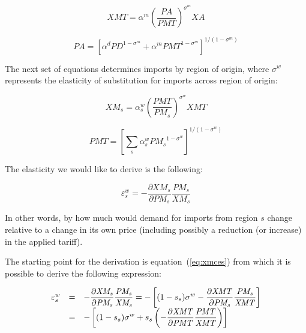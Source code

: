 \begin{equation}
\label{eq:xmtces}
\mathit{XMT} = \alpha^m \left(\frac{\mathit{PA}}{\mathit{PMT}}\right)^{\sigma^m}\mathit{XA}
\end{equation}

\begin{equation}
\label{eq:paces}
\mathit{PA} = \left[\alpha^d \mathit{PD}^{1-\sigma^m} + \alpha^m \mathit{PMT}^{1-\sigma^m}\right]^{1/(1-\sigma^m)}
\end{equation}

The next set of equations determines imports by region of origin, where $\sigma^w$ represents the elasticity of substitution for imports across region of origin:


\begin{equation}
\label{eq:xmces}
\mathit{XM_s} = \alpha^w_s \left(\frac{\mathit{PMT}}{\mathit{PM_s}}\right)^{\sigma^w}\mathit{XMT}
\end{equation}

\begin{equation}
\label{eq:pmtces}
\mathit{PMT} = \left[\sum_s{\alpha^w_s \mathit{PM_s}^{1-\sigma^w}}\right]^{1/(1-\sigma^w)}
\end{equation}

The elasticity we would like to derive is the following:

\begin{equation}
\label{eq:epswces}
\varepsilon^w_s = - \frac{\partial \mathit{XM_s}}{\partial \mathit{PM_s}}
\frac{\mathit{PM_s}}{\mathit{XM_s}}
\end{equation}

\noindent In other words, by how much would demand for imports from region $s$ change relative to a change in its own price (including possibly a reduction (or increase) in the applied tariff).

The starting point for the derivation is equation~(\ref{eq:xmces}) from which it is possible to derive the following expression:

\begin{equation}
\label{eq:epsw2ces}
\begin{array}{l c l}
\varepsilon^w_s & = & \displaystyle - \frac{\partial \mathit{XM_s}}{\partial \mathit{PM_s}}
\frac{\mathit{PM_s}}{\mathit{XM_s}}
= -\left[(1-s_s)\sigma^w - \frac{\partial \mathit{XMT}}{\partial \mathit{PM_s}}
\frac{\mathit{PM_s}}{\mathit{XMT}} \right] \\
{} & = &\displaystyle -\left[(1-s_s)\sigma^w + s_s \left(-\frac{\partial \mathit{XMT}}{\partial \mathit{PMT}}
\frac{\mathit{PMT}}{\mathit{XMT}}\right) \right]
\end{array}
\end{equation}

